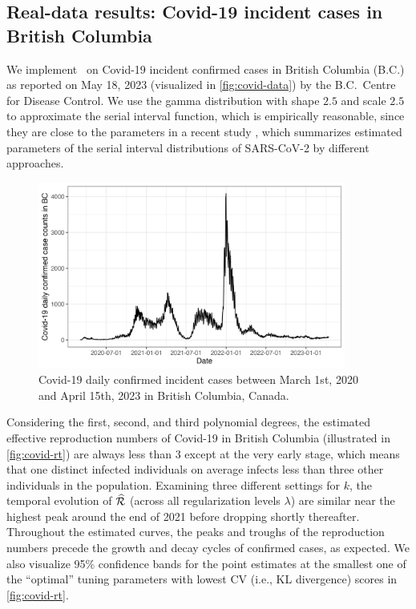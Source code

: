 \subsection{Real-data results: Covid-19 incident cases in British Columbia}

We implement \RtEstim\ on Covid-19 incident confirmed cases in British Columbia
(B.C.) as reported on May 18, 2023 (visualized in \autoref{fig:covid-data}) by
the B.C.\ Centre for Disease Control. 
We use the gamma distribution with shape $2.5$ and scale $2.5$
to approximate the serial interval function, which is empirically
reasonable, since they are close to the parameters in a recent study 
\citep{lehtinen2021relationship}, which summarizes estimated parameters of the 
serial interval distributions of SARS-CoV-2 by different approaches. 

\begin{figure}[tb]
    \centering
    \includegraphics[width=0.9\textwidth]{fig/covid_dat.png}
    \caption{Covid-19 daily confirmed incident cases between March 1st, 
    2020 and April 15th, 2023 in British Columbia, Canada.} 
    \label{fig:covid-data}
\end{figure} 

Considering the first, second, and third polynomial degrees, the estimated 
effective reproduction numbers of Covid-19 in British Columbia
(illustrated in \autoref{fig:covid-rt}) are always less than $3$ except at the 
very early stage, which means that one distinct infected individuals on average 
infects less than three other individuals in the population. 
Examining three different settings for $k$, 
the temporal evolution of $\widehat{\mathcal{R}}$ (across all regularization levels
$\lambda$) are similar near the highest peak around the end of 2021 before
dropping shortly thereafter. Throughout the estimated curves, the peaks and
troughs of the reproduction numbers precede the growth and decay cycles of
confirmed cases, as expected. We also visualize 95\% confidence bands for the
point estimates at the smallest one of the ``optimal'' tuning parameters with 
lowest CV (i.e., KL divergence) scores in \autoref{fig:covid-rt}.     

